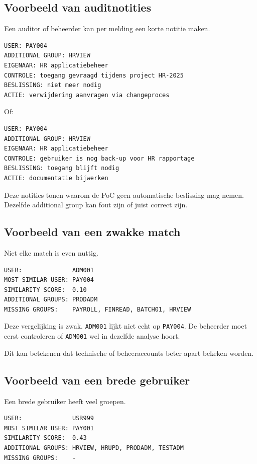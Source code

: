 \subsection*{Voorbeeld van auditnotities}

Een auditor of beheerder kan per melding een korte notitie maken.

\begin{verbatim}
USER: PAY004
ADDITIONAL GROUP: HRVIEW
EIGENAAR: HR applicatiebeheer
CONTROLE: toegang gevraagd tijdens project HR-2025
BESLISSING: niet meer nodig
ACTIE: verwijdering aanvragen via changeproces
\end{verbatim}

Of:

\begin{verbatim}
USER: PAY004
ADDITIONAL GROUP: HRVIEW
EIGENAAR: HR applicatiebeheer
CONTROLE: gebruiker is nog back-up voor HR rapportage
BESLISSING: toegang blijft nodig
ACTIE: documentatie bijwerken
\end{verbatim}

Deze notities tonen waarom de PoC geen automatische beslissing mag nemen. Dezelfde additional group kan fout zijn of juist correct zijn.

\subsection*{Voorbeeld van een zwakke match}

Niet elke match is even nuttig.

\begin{verbatim}
USER:              ADM001
MOST SIMILAR USER: PAY004
SIMILARITY SCORE:  0.10
ADDITIONAL GROUPS: PRODADM
MISSING GROUPS:    PAYROLL, FINREAD, BATCH01, HRVIEW
\end{verbatim}

Deze vergelijking is zwak. \texttt{ADM001} lijkt niet echt op \texttt{PAY004}. De beheerder moet eerst controleren of \texttt{ADM001} wel in dezelfde analyse hoort.

Dit kan betekenen dat technische of beheeraccounts beter apart bekeken worden.

\subsection*{Voorbeeld van een brede gebruiker}

Een brede gebruiker heeft veel groepen.

\begin{verbatim}
USER:              USR999
MOST SIMILAR USER: PAY001
SIMILARITY SCORE:  0.43
ADDITIONAL GROUPS: HRVIEW, HRUPD, PRODADM, TESTADM
MISSING GROUPS:    -
\end{verbatim}


